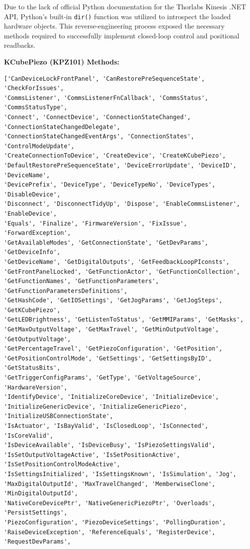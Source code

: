 \documentclass[12pt,a4paper]{article}
\begin{document}
Due to the lack of official Python documentation for the Thorlabs Kinesis .NET API, Python's built-in \texttt{dir()} function was utilized to introspect the loaded hardware objects. This reverse-engineering process exposed the necessary methods required to successfully implement closed-loop control and positional readbacks.

\textbf{KCubePiezo (KPZ101) Methods:}
\begin{verbatim}
['CanDeviceLockFrontPanel', 'CanRestorePreSequenceState', 'CheckForIssues', 
'CommsListener', 'CommsListenerFnCallback', 'CommsStatus', 'CommsStatusType', 
'Connect', 'ConnectDevice', 'ConnectionStateChanged', 'ConnectionStateChangedDelegate', 
'ConnectionStateChangedEventArgs', 'ConnectionStates', 'ControlModeUpdate', 
'CreateConnectionToDevice', 'CreateDevice', 'CreateKCubePiezo', 
'DefaultRestorePreSequenceState', 'DeviceErrorUpdate', 'DeviceID', 'DeviceName', 
'DevicePrefix', 'DeviceType', 'DeviceTypeNo', 'DeviceTypes', 'DisableDevice', 
'Disconnect', 'DisconnectTidyUp', 'Dispose', 'EnableCommsListener', 'EnableDevice', 
'Equals', 'Finalize', 'FirmwareVersion', 'FixIssue', 'ForwardException', 
'GetAvailableModes', 'GetConnectionState', 'GetDevParams', 'GetDeviceInfo', 
'GetDeviceName', 'GetDigitalOutputs', 'GetFeedbackLoopPIconsts', 
'GetFrontPanelLocked', 'GetFunctionActor', 'GetFunctionCollection', 
'GetFunctionNames', 'GetFunctionParameters', 'GetFunctionParametersDefinitions', 
'GetHashCode', 'GetIOSettings', 'GetJogParams', 'GetJogSteps', 'GetKCubePiezo', 
'GetLEDBrightness', 'GetListenToStatus', 'GetMMIParams', 'GetMasks', 
'GetMaxOutputVoltage', 'GetMaxTravel', 'GetMinOutputVoltage', 'GetOutputVoltage', 
'GetPercentageTravel', 'GetPiezoConfiguration', 'GetPosition', 
'GetPositionControlMode', 'GetSettings', 'GetSettingsByID', 'GetStatusBits', 
'GetTriggerConfigParams', 'GetType', 'GetVoltageSource', 'HardwareVersion', 
'IdentifyDevice', 'InitializeCoreDevice', 'InitializeDevice', 
'InitializeGenericDevice', 'InitializeGenericPiezo', 'InitializeUSBConnectionState', 
'IsActuator', 'IsBayValid', 'IsClosedLoop', 'IsConnected', 'IsCoreValid', 
'IsDeviceAvailable', 'IsDeviceBusy', 'IsPiezoSettingsValid', 
'IsSetOutputVoltageActive', 'IsSetPositionActive', 'IsSetPositionControlModeActive', 
'IsSettingsInitialized', 'IsSettingsKnown', 'IsSimulation', 'Jog', 
'MaxDigitalOutputId', 'MaxTravelChanged', 'MemberwiseClone', 'MinDigitalOutputId', 
'NativeCoreDevicePtr', 'NativeGenericPiezoPtr', 'Overloads', 'PersistSettings', 
'PiezoConfiguration', 'PiezoDeviceSettings', 'PollingDuration', 
'RaiseDeviceException', 'ReferenceEquals', 'RegisterDevice', 'RequestDevParams', 

\end{verbatim}
\end{document}
